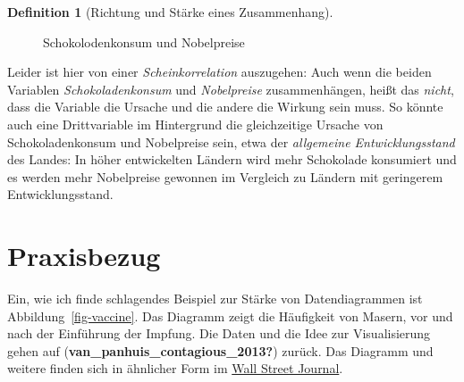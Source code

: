 \documentclass[
  a4paper,
  DIV=11]{scrreprt}
\theoremstyle{definition}
\theoremstyle{definition}
\theoremstyle{definition}
\newtheorem{definition}{Definition}[chapter]
\theoremstyle{remark}
\begin{document}
\begin{definition}[Richtung und Stärke eines
Zusammenhang]
\begin{figure}
{}

\caption{\label{fig-choc}Schokolodenkonsum und Nobelpreise}

\end{figure}%

Leider ist hier von einer \emph{Scheinkorrelation} auszugehen: Auch wenn
die beiden Variablen \emph{Schokoladenkonsum} und \emph{Nobelpreise}
zusammenhängen, heißt das \emph{nicht}, dass die Variable die Ursache
und die andere die Wirkung sein muss. So könnte auch eine Drittvariable
im Hintergrund die gleichzeitige Ursache von Schokoladenkonsum und
Nobelpreise sein, etwa der \emph{allgemeine Entwicklungsstand} des
Landes: In höher entwickelten Ländern wird mehr Schokolade konsumiert
und es werden mehr Nobelpreise gewonnen im Vergleich zu Ländern mit
geringerem Entwicklungsstand.

\section{Praxisbezug}\label{praxisbezug-3}

Ein, wie ich finde schlagendes Beispiel zur Stärke von Datendiagrammen
ist Abbildung~\ref{fig-vaccine}. Das Diagramm zeigt die Häufigkeit von
Masern, vor und nach der Einführung der Impfung. Die Daten und die Idee
zur Visualisierung gehen auf (\textbf{van\_panhuis\_contagious\_2013?})
zurück. Das Diagramm und weitere finden sich in ähnlicher Form im
\href{http://graphics.wsj.com/infectious-diseases-and-vaccines/}{Wall
Street Journal}.

\begin{figure}



\end{figure}
\end{definition}
\end{document}
